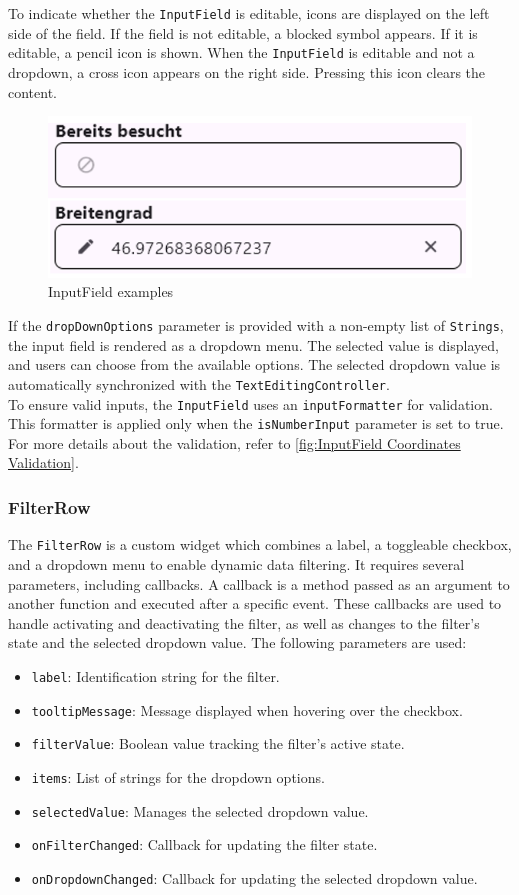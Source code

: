 To indicate whether the \texttt{InputField} is editable, icons are displayed on the left side of the field. If the field is not editable, a blocked symbol appears. If it is editable, a pencil icon is shown. When the \texttt{InputField} is editable and not a dropdown, a cross icon appears on the right side. Pressing this icon clears the content.

\begin{figure}[H]
    \centering
    \includegraphics[width=0.4\linewidth]{images/AdminPanel/InputFieldExamples.png}
    \caption{InputField examples}
\end{figure}

If the \texttt{dropDownOptions} parameter is provided with a non-empty list of \texttt{Strings}, the input field is rendered as a dropdown menu. The selected value is displayed, and users can choose from the available options. The selected dropdown value is automatically synchronized with the \texttt{TextEditingController}. \\

To ensure valid inputs, the \texttt{InputField} uses an \texttt{inputFormatter} for validation. This formatter is applied only when the \texttt{isNumberInput} parameter is set to true. For more details about the validation, refer to \ref{fig:InputField Coordinates Validation}.


\subsubsection{FilterRow}
\label{fig:FilterRow}

The \texttt{FilterRow} is a custom widget which combines a label, a toggleable checkbox, and a dropdown menu to enable dynamic data filtering. It requires several parameters, including callbacks. A callback is a method passed as an argument to another function and executed after a specific event. These callbacks are used to handle activating and deactivating the filter, as well as changes to the filter's state and the selected dropdown value. The following parameters are used:

\begin{itemize}
    \item \texttt{label}: Identification string for the filter.
    \item \texttt{tooltipMessage}: Message displayed when hovering over the checkbox.
    \item \texttt{filterValue}: Boolean value tracking the filter's active state.
    \item \texttt{items}: List of strings for the dropdown options.
    \item \texttt{selectedValue}: Manages the selected dropdown value.
    \item \texttt{onFilterChanged}: Callback for updating the filter state.
    \item \texttt{onDropdownChanged}: Callback for updating the selected dropdown value.
\end{itemize}



